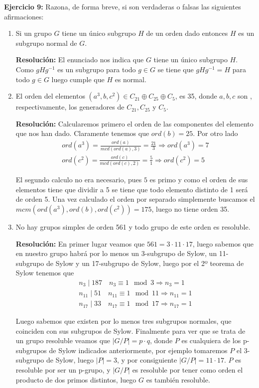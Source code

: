 \documentclass{article}
\begin{document}
\textbf{Ejercicio 9:} Razona, de forma breve, si son verdaderas o falsas las siguientes afirmaciones:
\begin{enumerate}
\item Si un grupo $G$ tiene un único subgrupo $H$ de un orden dado entonces $H$ es un subgrupo normal de $G$.

\textbf{Resolución:} El enunciado nos indica que $G$ tiene un único subgrupo $H$. Como $gHg^{-1}$ es un subgrupo para todo $g\in G$ se tiene que $gHg^{-1}=H$ para todo $g\in G$ luego cumple que $H$ es normal.

\item El orden del elementos $(a^3,b,c^2)\in C_{21}\oplus C_{25}\oplus C_5$, es 35, donde $a,b,c$ son , respectivamente, los generadores de $C_{21},C_{25}$ y $C_5$.

\textbf{Resolución:} Calcularemos primero el orden de las componentes del elemento que nos han dado. Claramente tenemos que $ord(b)=25$. Por otro lado
\begin{gather*}
ord(a^3)=\frac{ord(a)}{mcd(ord(a),3)}=\frac{21}{3}\Rightarrow ord(a^3)=7\\
ord(c^2)=\frac{ord(c)}{mcd(ord(c),2)}=\frac{5}{1}\Rightarrow ord(c^2)=5
\end{gather*}

El segundo calculo no era necesario, pues $5$ es primo y como el orden de sus elementos tiene que dividir a 5 se tiene que todo elemento distinto de 1 será de orden 5. Una vez calculado el orden por separado simplemente buscamos el $mcm(ord(a^3),ord(b),ord(c^2))=175$, luego no tiene orden 35.

\item No hay grupos simples de orden 561 y todo grupo de este orden es resoluble.

\textbf{Resolución:} En primer lugar veamos que $561=3\cdot 11\cdot 17$, luego sabemos que en nuestro grupo habrá por lo menos un 3-subgrupo de Sylow, un 11-subgrupo de Sylow y un 17-subgrupo de Sylow, luego por el 2º teorema de Sylow tenemos que
\begin{gather*}
n_3\mid 187 \quad n_3\equiv 1\mod 3\Rightarrow n_3=1\\
n_{11}\mid 51 \quad n_{11}\equiv 1\mod 11 \Rightarrow n_{11}=1\\
n_{17}\mid 33 \quad n_{17}\equiv 1\mod 17 \Rightarrow n_{17}=1
\end{gather*}

Luego sabemos que existen por lo menos tres subgrupos normales, que coinciden con sus subgrupos de Sylow. Finalmente para ver que se trata de un grupo resoluble veamos que
$|G/P|=p\cdot q$, donde $P$ es cualquiera de los p-subgrupos de Sylow indicados anteriormente, por ejemplo tomaremos $P$ el 3-subgrupo de Sylow, luego $|P|=3$, y por consiguiente $|G/P|=11\cdot 17$. $P$ es resoluble por ser un p-grupo, y $|G/P|$ es resoluble por tener como orden el producto de dos primos distintos, luego $G$ es también resoluble.


\end{enumerate}
\end{document}
